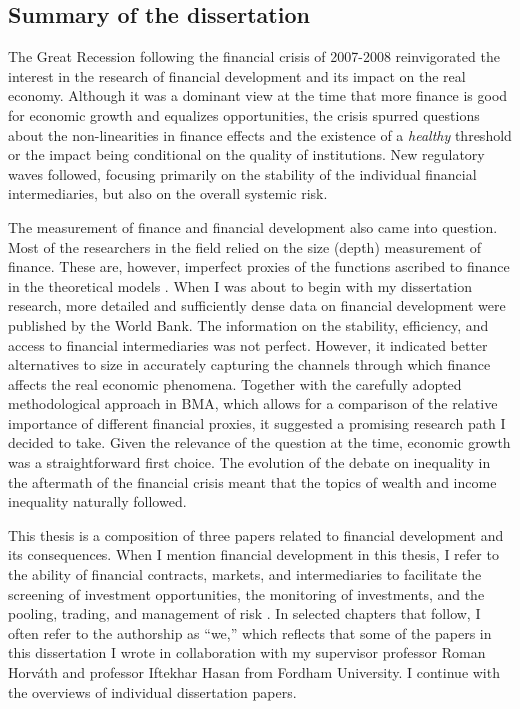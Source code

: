 \begin{refsection}
\chapter{Summary of the dissertation}
\label{ch1}
The Great Recession following the financial crisis of 2007-2008 reinvigorated the interest in the research of financial development and its impact on the real economy. Although it was a dominant view at the time that more finance is good for economic growth and equalizes opportunities, the crisis spurred questions about the non-linearities in finance effects and the existence of a \emph{healthy} threshold or the impact being conditional on the quality of institutions. New regulatory waves followed, focusing primarily on the stability of the individual financial intermediaries, but also on the overall systemic risk. 

The measurement of finance and financial development also came into question. Most of the researchers in the field relied on the size (depth) measurement of finance. These are, however, imperfect proxies of the functions ascribed to finance in the theoretical models \parencite{Levine2005}. When I was about to begin with my dissertation research, more detailed and sufficiently dense data on financial development were published by the World Bank. The information on the stability, efficiency, and access to financial intermediaries was not perfect. However, it indicated better alternatives to size in accurately capturing the channels through which finance affects the real economic phenomena. Together with the carefully adopted methodological approach in \ac{BMA}, which allows for a comparison of the relative importance of different financial proxies, it suggested a promising research path I decided to take. Given the relevance of the question at the time, economic growth was a straightforward first choice. The evolution of the debate on inequality in the aftermath of the financial crisis meant that the topics of wealth and income inequality naturally followed.

This thesis is a composition of three papers related to financial development and its consequences. When I mention financial development in this thesis, I refer to the ability of financial contracts, markets, and intermediaries to facilitate the screening of investment opportunities, the monitoring of investments, and the pooling, trading, and management of risk \parencite{demirgucc2009finance}. In selected chapters that follow, I often refer to the authorship as ``we,'' which reflects that some of the papers in this dissertation I wrote in collaboration with my supervisor professor Roman Horv\'{a}th and professor Iftekhar Hasan from Fordham University. I continue with the overviews of individual dissertation papers.


\end{refsection}
